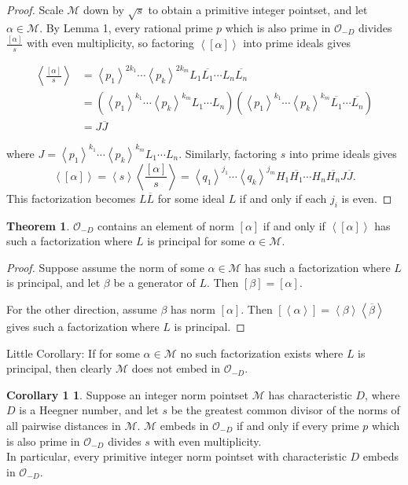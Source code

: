 \documentclass[a4paper]{article}
\theoremstyle{plain}
\theoremstyle{definition}
\newcommand{\thering}
{
\mathcal{O}_{-D}
}
\newcommand{\M}
{
\mathcal{M}
}
\newcommand{\norm}[1]
{
\left[ #1 \right]
}
\newcommand{\ideal}[1]
{
\left\langle #1 \right\rangle
}
\newcommand{\conjid}[1]
{
\overline{#1}
}
\newtheorem*{thm1}{Theorem}
\newtheorem*{cor1}{Corollary 1}
\begin{document}
\begin{proof}
Scale $\M$ down by $\sqrt{s}$ to obtain a primitive integer pointset, and let $\alpha \in \M$.  By Lemma 1, every rational prime $p$ which is also prime in $\thering$ divides $\frac{\norm{\alpha}}{s}$ with even multiplicity, so factoring $\ideal{\norm{\alpha}}$ into prime ideals gives

\begin{align*}
\ideal{\frac{\norm{\alpha}}{s}} &= \ideal{p_1}^{2k_1} \cdots \ideal{p_k}^{2k_m} L_1 \conjid{L_1} \cdots L_n \conjid{L_n}
\\
&= \left(\ideal{p_1}^{k_1} \cdots \ideal{p_k}^{k_m} L_1 \cdots L_n \right)  \left( \ideal{p_1}^{k_1} \cdots \ideal{p_k}^{k_m} \conjid{L_1} \cdots \conjid{L_n} \right)
\\
&= J \conjid{J}
\end{align*}

where $J = \ideal{p_1}^{k_1} \cdots \ideal{p_k}^{k_m} L_1 \cdots L_n$.  Similarly, factoring $s$ into prime ideals gives
$$\ideal{\norm{\alpha}} = \ideal{s}\ideal{\frac{\norm{\alpha}}{s}} = \ideal{q_1}^{j_1} \cdots \ideal{q_k}^{j_m} H_1 \conjid{H_1} \cdots H_n \conjid{H_n}J\conjid{J}.$$  This factorization becomes $L \conjid{L}$ for some ideal $L$ if and only if each $j_i$ is even.

\end{proof}

\begin{thm1}
$\thering$ contains an element of norm $\norm{\alpha}$ if and only if $\ideal{\norm{\alpha}}$ has such a factorization where $L$ is principal for some $\alpha \in \M$.
\end{thm1}

\begin{proof}
Suppose assume the norm of some $\alpha \in \M$ has such a factorization where $L$ is principal, and let $\beta$ be a generator of $L$.  Then $\norm{\beta} = \norm{\alpha}$.

For the other direction, assume $\beta$ has norm $\norm{\alpha}$.  Then $\norm{\ideal{\alpha}} = \ideal{\beta}\ideal{\conjid{\beta}}$ gives such a factorization where $L$ is principal.


\end{proof}

\noindent Little Corollary: If for some $\alpha \in \M$ no such factorization exists where $L$ is principal, then clearly $\M$ does not embed in $\thering$.

\begin{cor1}

Suppose an integer norm pointset $\M$ has characteristic $D$, where $D$ is a Heegner number, and let $s$ be the greatest common divisor of the norms of all pairwise distances in $\M$.
$\M$ embeds in $\thering$ if and only if every prime $p$ which is also prime in $\thering$ divides $s$ with even multiplicity.
\\
\indent In particular, every primitive integer norm pointset with characteristic $D$ embeds in $\thering$.

\end{cor1}
\end{document}
